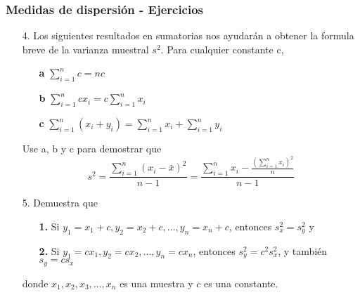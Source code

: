 \documentclass[10pt]{beamer}
\theoremstyle{plain} %
\theoremstyle{definition}
\theoremstyle{remark}
\begin{document}
\begin{frame}
\frametitle{Medidas de dispersión - Ejercicios}
\begin{itemize}
\item[4.]Los siguientes resultados en sumatorias nos ayudarán a obtener la formula breve de la varianza muestral $s^2$. Para cualquier constante c,
\begin{itemize}
\item[\textbf{a}]$\sum_{i=1}^n c=nc$
\item[\textbf{b}]$\sum_{i=1}^n cx_i=c\sum_{i=1}^n x_i$
\item[\textbf{c}]$\sum_{i=1}^n (x_i+y_i)=\sum_{i=1}^n x_i+\sum_{i=1}^n y_i$
\end{itemize}
Use a, b y c para demostrar que
$$s^2=\frac{\sum_{i=1}^n (x_i-\bar{x})^2}{n-1}=\frac{{\sum_{i=1}^n x_i}-\frac{\left(\sum_{i=1}^n x_i\right)^2}{n}}{n-1}$$
\item[5.]Demuestra que
\begin{itemize}
\item[\textbf{1.}]Si $y_1=x_1+c, y_2=x_2+c, \ldots, y_n=x_n+c$, entonces $s_x^2=s_y^2$ y
\item[\textbf{2.}]Si $y_1=cx_1, y_2=cx_2, \ldots, y_n=cx_n$, entonces $s_y^2=c^2s_x^2$, y también $s_y=cs_x$ 
\end{itemize} 
donde $x_1,x_2,x_3,\ldots,x_n$ es una muestra y $c$ es una constante.
\end{itemize} 
\end{frame}
\end{document}
